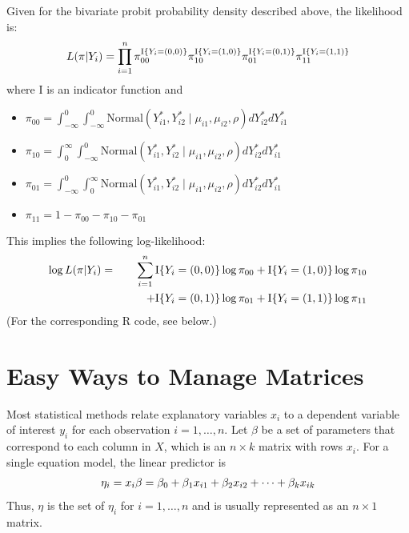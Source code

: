 \documentclass[letterpaper,10pt,english]{sphinxmanual}
\begin{document}
Given for the bivariate probit probability density described above, the
likelihood is:
\begin{gather}
\begin{split}L(\mathbf{\pi} | Y_i) = \prod_{i=1}^n
                    \pi_{00}^{\textrm{I}\{Y_i = (0,0)\}}
                    \pi_{10}^{\textrm{I}\{Y_i = (1,0)\}}
                    \pi_{01}^{\textrm{I}\{Y_i = (0,1)\}}
                    \pi_{11}^{\textrm{I}\{Y_i = (1,1)\}}\end{split}\notag
\end{gather}
where I is an indicator function and
\begin{itemize}
\item {} 
\(\pi_{00} = \int_{-\infty}^0 \int_{-\infty}^0 \textrm{Normal}(Y_{i1}^*, Y_{i2}^* \mid
\mu_{i1}, \mu_{i2}, \rho) dY_{i2}^* dY_{i1}^*\)

\item {} 
\(\pi_{10} = \int_0^{\infty} \int_{-\infty}^0 \textrm{Normal}(Y_{i1}^*, Y_{i2}^* \mid
\mu_{i1}, \mu_{i2}, \rho) dY_{i2}^* dY_{i1}^*\)

\item {} 
\(\pi_{01} = \int_{-\infty}^0 \int_0^{\infty} \textrm{Normal}(Y_{i1}^*, Y_{i2}^* \mid
\mu_{i1}, \mu_{i2}, \rho) dY_{i2}^* dY_{i1}^*\)

\item {} 
\(\pi_{11} = 1-\pi_{00}-\pi_{10}-\pi_{01}\)

\end{itemize}

This implies the following log-likelihood:
\begin{gather}
\begin{split}\begin{aligned}
\log L(\mathbf{\pi} | Y_i) &=& \sum_{i=1}^n \textrm{I}\{Y_i = (0,0)\} \log\pi_{00}
+ \textrm{I}\{Y_i = (1,0)\} \log \pi_{10} \\
&& \quad \quad + \textrm{I}\{Y_i = (0,1)\} \log \pi_{01}
+ \textrm{I}\{Y_i = (1,1)\} \log \pi_{11}\end{aligned}\end{split}\notag
\end{gather}
(For the corresponding R code, see below.)


\section{Easy Ways to Manage Matrices}
\label{8_writing_new_models:easy-ways-to-manage-matrices}
Most statistical methods relate explanatory variables \(x_i\) to a
dependent variable of interest \(y_i\) for each observation
\(i = 1,
\dots, n\). Let \(\beta\) be a set of parameters that correspond to
each column in \(X\), which is an \(n \times k\) matrix with
rows \(x_i\). For a single equation model, the linear predictor is
\begin{gather}
\begin{split}\eta_i = x_i \beta = \beta_0 + \beta_1 x_{i1} +
\beta_2 x_{i2} + \dots + \beta_k x_{ik}\end{split}\notag
\end{gather}
Thus, \(\eta\) is the set of \(\eta_i\) for
\(i = 1, \dots, n\) and is usually represented as an
\(n \times 1\) matrix.
\end{document}
